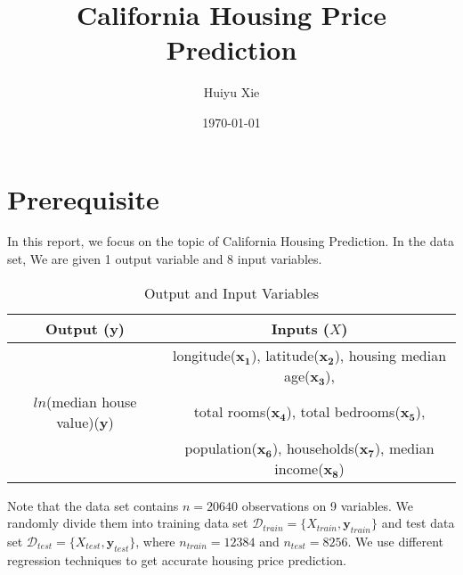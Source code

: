 \documentclass[12pt,a4paper]{article}
\begin{document}
\title{California Housing Price Prediction}
\author{Huiyu Xie}
\date{\today}
\maketitle

\newpage
\tableofcontents


\newpage
\section{Prerequisite}
\qquad In this report, we focus on the topic of California Housing Prediction. In the data set, We are given 1 output variable and 8 input variables.

\begin{table}[h]
	\centering
	\begin{tabular}{c|c}
		Output ($\bm{y}$) & Inputs ($X$) \\
		\hline
		& longitude($\bm{x_{1}}$), latitude($\bm{x_{2}}$), housing median age($\bm{x_{3}}$),\\
		$ln$(median house value)($\bm{y}$) & total rooms($\bm{x_{4}}$), total bedrooms($\bm{x_{5}}$),\\
		& population($\bm{x_{6}}$), households($\bm{x_{7}}$), median income($\bm{x_{8}}$)\\
\end{tabular}
\caption{Output and Input Variables}\label{Table:1}
\end{table}
Note that the data set contains $n=20640$ observations on 9 variables. We randomly divide them into training data set $\mathcal{D}_{train}=\{X_{train},\bm{y}_{train}\}$ and test data set $\mathcal{D}_{test}=\{X_{test},\bm{y}_{test}\}$, where $n_{train}=12384$ and $n_{test}=8256$. We use different regression techniques to get accurate housing price prediction.
\end{document}
